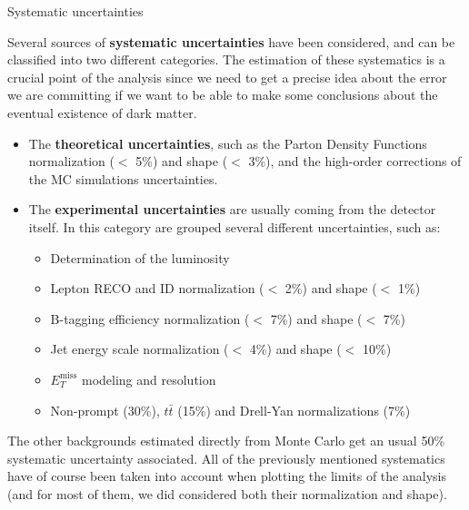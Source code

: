 \documentclass[8 pt]{beamer}
\begin{document}
\begin{frame}{Systematic uncertainties}

	\justifying
	Several sources of \textbf{systematic uncertainties} have been considered, and can be classified into two different categories. The estimation of these systematics is a crucial point of the analysis since we need to get a precise idea about the error we are committing if we want to be able to make some conclusions about the eventual existence of dark matter. \vfill
	
	\begin{itemize}
	\justifying
	\item The \textbf{\color{mycolor}theoretical uncertainties\color{black}}, such as the Parton Density Functions normalization ($<$ 5\%) and shape ($<$ 3\%), and the high-order corrections of the MC simulations uncertainties. \vfill
	\item The \textbf{\color{mycolor}experimental uncertainties\color{black}} are usually coming from the detector itself. In this category are grouped several different uncertainties, such as:
	\vspace{-5pt}
		\begin{multicols}{2}
		\begin{itemize}
		\item Determination of the luminosity
		\item Lepton RECO and ID normalization ($<$ 2\%) and shape ($<$ 1\%)
		\item B-tagging efficiency normalization ($<$ 7\%) and shape ($<$ 7\%)
		\item Jet energy scale normalization ($<$ 4\%) and shape ($<$ 10\%)
		\item $E_T^{\text{miss}}$ modeling and resolution 
		\item Non-prompt (30\%), $t \bar t$ (15\%) and Drell-Yan normalizations (7\%)
		\end{itemize}
		\end{multicols}
	\end{itemize} \vfill
	
	\justifying
	The other backgrounds estimated directly from Monte Carlo get an usual 50\% systematic uncertainty associated. All of the previously mentioned systematics have of course been taken into account when plotting the limits of the analysis (and for most of them, we did considered both their normalization and shape). \vfill

\end{frame}
\end{document}
